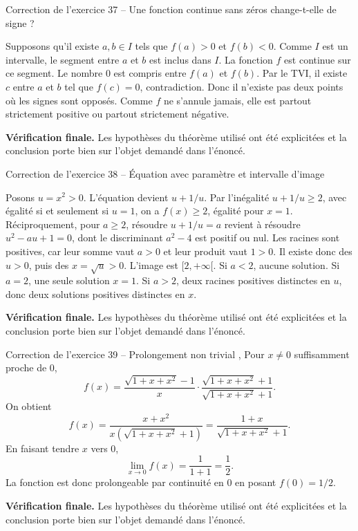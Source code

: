 \documentclass[11pt,a4paper]{article}
\begin{document}
\begin{corrbox}{Correction de l'exercice 37 -- Une fonction continue sans zéros change-t-elle de signe ?}

Supposons qu'il existe $a,b\in I$ tels que $f(a)>0$ et $f(b)<0$. Comme $I$ est un intervalle, le segment entre $a$ et $b$ est inclus dans $I$. La fonction $f$ est continue sur ce segment. Le nombre $0$ est compris entre $f(a)$ et $f(b)$. Par le TVI, il existe $c$ entre $a$ et $b$ tel que $f(c)=0$, contradiction. Donc il n'existe pas deux points où les signes sont opposés. Comme $f$ ne s'annule jamais, elle est partout strictement positive ou partout strictement négative.

\medskip
\textbf{Vérification finale.} Les hypothèses du théorème utilisé ont été explicitées et la conclusion porte bien sur l'objet demandé dans l'énoncé.
\end{corrbox}


\begin{corrbox}{Correction de l'exercice 38 -- Équation avec paramètre et intervalle d'image}

Posons $u=x^2>0$. L'équation devient $u+1/u$. Par l'inégalité $u+1/u\geq2$, avec égalité si et seulement si $u=1$, on a $f(x)\geq2$, égalité pour $x=1$. Réciproquement, pour $a\geq2$, résoudre $u+1/u=a$ revient à résoudre $u^2-au+1=0$, dont le discriminant $a^2-4$ est positif ou nul. Les racines sont positives, car leur somme vaut $a>0$ et leur produit vaut $1>0$. Il existe donc des $u>0$, puis des $x=\sqrt u>0$. L'image est $[2,+\infty[$. Si $a<2$, aucune solution. Si $a=2$, une seule solution $x=1$. Si $a>2$, deux racines positives distinctes en $u$, donc deux solutions positives distinctes en $x$.

\medskip
\textbf{Vérification finale.} Les hypothèses du théorème utilisé ont été explicitées et la conclusion porte bien sur l'objet demandé dans l'énoncé.
\end{corrbox}


\begin{corrbox}{Correction de l'exercice 39 -- Prolongement non trivial}
,
Pour $x\neq0$ suffisamment proche de $0$,
\[
f(x)=\frac{\sqrt{1+x+x^2}-1}{x}\cdot \frac{\sqrt{1+x+x^2}+1}{\sqrt{1+x+x^2}+1}.
\]
On obtient
\[
f(x)=\frac{x+x^2}{x(\sqrt{1+x+x^2}+1)}=\frac{1+x}{\sqrt{1+x+x^2}+1}.
\]
En faisant tendre $x$ vers $0$,
\[
\lim_{x\to0}f(x)=\frac{1}{1+1}=\frac12.
\]
La fonction est donc prolongeable par continuité en $0$ en posant $f(0)=1/2$.

\medskip
\textbf{Vérification finale.} Les hypothèses du théorème utilisé ont été explicitées et la conclusion porte bien sur l'objet demandé dans l'énoncé.
\end{corrbox}
\end{document}
